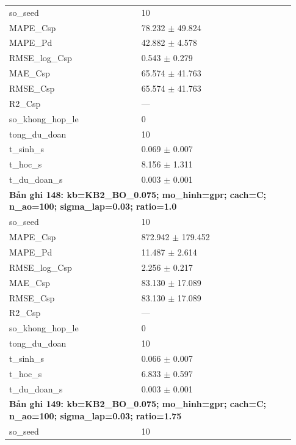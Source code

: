 \begin{longtable}{p{0.43\linewidth}p{0.50\linewidth}}
so\_\allowbreak seed & 10 \\
MAPE\_\allowbreak Csp & 78.232 $\pm$ 49.824 \\
MAPE\_\allowbreak Pd & 42.882 $\pm$ 4.578 \\
RMSE\_\allowbreak log\_\allowbreak Csp & 0.543 $\pm$ 0.279 \\
MAE\_\allowbreak Csp & 65.574 $\pm$ 41.763 \\
RMSE\_\allowbreak Csp & 65.574 $\pm$ 41.763 \\
R2\_\allowbreak Csp & — \\
so\_\allowbreak khong\_\allowbreak hop\_\allowbreak le & 0 \\
tong\_\allowbreak du\_\allowbreak doan & 10 \\
t\_\allowbreak sinh\_\allowbreak s & 0.069 $\pm$ 0.007 \\
t\_\allowbreak hoc\_\allowbreak s & 8.156 $\pm$ 1.311 \\
t\_\allowbreak du\_\allowbreak doan\_\allowbreak s & 0.003 $\pm$ 0.001 \\
\midrule
\multicolumn{2}{p{0.95\linewidth}}{\textbf{Bản ghi 148: kb=KB2\_BO\_0.075; mo\_hinh=gpr; cach=C; n\_ao=100; sigma\_lap=0.03; ratio=1.0}} \\
so\_\allowbreak seed & 10 \\
MAPE\_\allowbreak Csp & 872.942 $\pm$ 179.452 \\
MAPE\_\allowbreak Pd & 11.487 $\pm$ 2.614 \\
RMSE\_\allowbreak log\_\allowbreak Csp & 2.256 $\pm$ 0.217 \\
MAE\_\allowbreak Csp & 83.130 $\pm$ 17.089 \\
RMSE\_\allowbreak Csp & 83.130 $\pm$ 17.089 \\
R2\_\allowbreak Csp & — \\
so\_\allowbreak khong\_\allowbreak hop\_\allowbreak le & 0 \\
tong\_\allowbreak du\_\allowbreak doan & 10 \\
t\_\allowbreak sinh\_\allowbreak s & 0.066 $\pm$ 0.007 \\
t\_\allowbreak hoc\_\allowbreak s & 6.833 $\pm$ 0.597 \\
t\_\allowbreak du\_\allowbreak doan\_\allowbreak s & 0.003 $\pm$ 0.001 \\
\midrule
\multicolumn{2}{p{0.95\linewidth}}{\textbf{Bản ghi 149: kb=KB2\_BO\_0.075; mo\_hinh=gpr; cach=C; n\_ao=100; sigma\_lap=0.03; ratio=1.75}} \\
so\_\allowbreak seed & 10 \\

\end{longtable}
